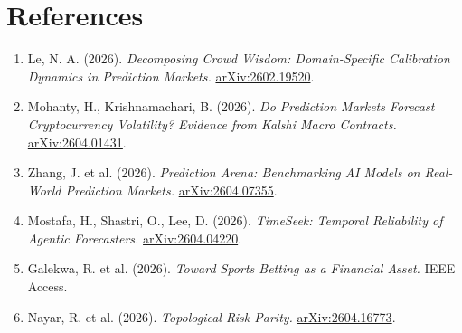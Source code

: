 \documentclass[11pt]{article}
\begin{document}
\section{References}

\begin{enumerate}
\item Le, N. A. (2026). \emph{Decomposing Crowd Wisdom: Domain-Specific Calibration Dynamics in Prediction Markets.} \href{https://arxiv.org/abs/2602.19520}{arXiv:2602.19520}.
\item Mohanty, H., Krishnamachari, B. (2026). \emph{Do Prediction Markets Forecast Cryptocurrency Volatility? Evidence from Kalshi Macro Contracts.} \href{https://arxiv.org/abs/2604.01431}{arXiv:2604.01431}.
\item Zhang, J. et al. (2026). \emph{Prediction Arena: Benchmarking AI Models on Real-World Prediction Markets.} \href{https://arxiv.org/abs/2604.07355}{arXiv:2604.07355}.
\item Mostafa, H., Shastri, O., Lee, D. (2026). \emph{TimeSeek: Temporal Reliability of Agentic Forecasters.} \href{https://arxiv.org/abs/2604.04220}{arXiv:2604.04220}.
\item Galekwa, R. et al. (2026). \emph{Toward Sports Betting as a Financial Asset.} IEEE Access.
\item Nayar, R. et al. (2026). \emph{Topological Risk Parity.} \href{https://arxiv.org/abs/2604.16773}{arXiv:2604.16773}.
\end{enumerate}
\end{document}
